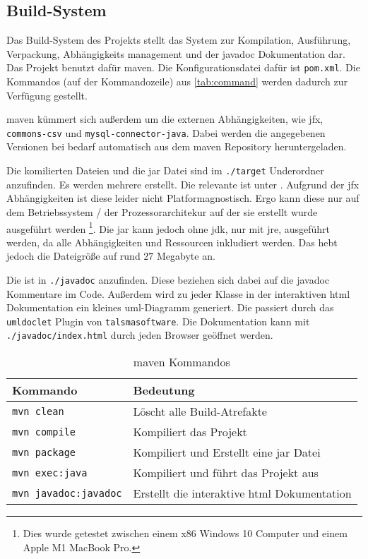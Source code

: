 \subsection{Build-System}

Das Build-System des Projekts stellt das System zur Kompilation, Ausführung, Verpackung, Abhängigkeits management und der \gls{javadoc} Dokumentation dar.
Das Projekt benutzt dafür \gls{maven}.
Die Konfigurationsdatei dafür ist \texttt{pom.xml}.
Die Kommandos (auf der Kommandozeile) aus \autoref{tab:command} werden dadurch zur Verfügung gestellt.

\gls{maven} kümmert sich außerdem um die externen Abhängigkeiten, wie \gls{jfx}, \texttt{commons-csv} und \texttt{mysql-connector-java}.
Dabei werden die angegebenen Versionen bei bedarf automatisch aus dem \gls{maven} Repository heruntergeladen.

Die komilierten Dateien und die \gls{jar} Datei sind im \texttt{./target} Underordner anzufinden.
Es werden mehrere  erstellt.
Die relevante ist unter \texttt{}.
Aufgrund der \gls{jfx} Abhängigkeiten ist diese leider nicht Platformagnostisch.
Ergo kann diese nur auf dem Betriebssystem / der Prozessorarchitekur auf der sie erstellt wurde ausgeführt werden \footnote{Dies wurde getestet zwischen einem x86 Windows 10 Computer und einem Apple M1 MacBook Pro.}.
Die \gls{jar} kann jedoch ohne \gls{jdk}, nur mit \gls{jre}, ausgeführt werden, da alle Abhängigkeiten und Ressourcen inkludiert werden.
Das hebt jedoch die Dateigröße auf rund $27$ Megabyte an.

Die  ist in \texttt{./javadoc} anzufinden.
Diese beziehen sich dabei auf die \gls{javadoc} Kommentare im Code.
Außerdem wird zu jeder Klasse in der interaktiven \gls{html} Dokumentation ein kleines \gls{uml}-Diagramm generiert.
Die passiert durch das \texttt{umldoclet} Plugin von \texttt{talsmasoftware}.
Die Dokumentation kann mit \texttt{./javadoc/index.html} durch jeden Browser geöffnet werden.

\begin{table}[h]
\centering
\begin{tabularx}{0.8\textwidth}{|l|X|}
    \hline
    \textbf{Kommando} & \textbf{Bedeutung} \\
    \hline
    \texttt{mvn clean} & Löscht alle Build-Atrefakte \\
    \texttt{mvn compile} & Kompiliert das Projekt \\
    \texttt{mvn package} & Kompiliert und Erstellt eine \gls{jar} Datei \\
    \texttt{mvn exec:java} & Kompiliert und führt das Projekt aus \\
    \texttt{mvn javadoc:javadoc} & Erstellt die interaktive \acrshort{html} Dokumentation \\
    \hline
\end{tabularx}
\caption{\gls{maven} Kommandos}
\label{tab:command}
\end{table}
